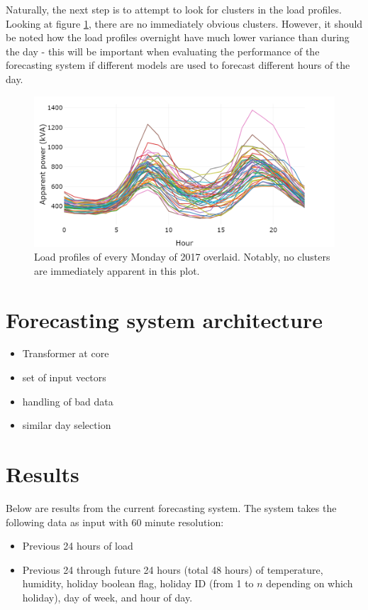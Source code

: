 Naturally, the next step is to attempt to look for clusters in the load profiles.
Looking at figure \ref{fig:all-monday-profiles}, there are no immediately obvious clusters.
However, it should be noted how the load profiles overnight have much lower variance than during the day - this will be important when evaluating the performance of the forecasting system if different models are used to forecast different hours of the day.

\begin{figure}
	\centering
	\includegraphics[width=0.8\linewidth]{images/all-monday-profiles}
	\caption{Load profiles of every Monday of 2017 overlaid. Notably, no clusters are immediately apparent in this plot.}
	\label{fig:all-monday-profiles}
\end{figure}


\section{Forecasting system architecture}
\begin{itemize}
	\item Transformer at core
	\item set of input vectors
	\item handling of bad data
	\item similar day selection
\end{itemize}


\section{Results}
\label{bruny-results}
Below are results from the current forecasting system.
The system takes the following data as input with 60 minute resolution:
\begin{itemize}
	\item Previous 24 hours of load
	\item Previous 24 through future 24 hours (total 48 hours) of temperature, humidity, holiday boolean flag, holiday ID (from 1 to $n$ depending on which holiday), day of week, and hour of day.
\end{itemize}

